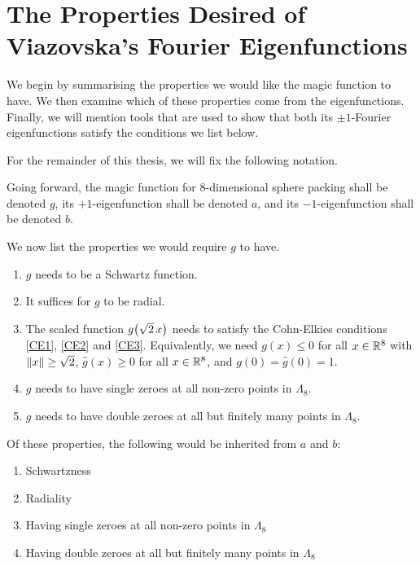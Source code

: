 \section{The Properties Desired of Viazovska's Fourier Eigenfunctions}
\label{Ch3:Sec:Properties}

We begin by summarising the properties we would like the magic function to have. We then examine which of these properties come from the eigenfunctions. Finally, we will mention tools that are used to show that both its $\pm 1$-Fourier eigenfunctions satisfy the conditions we list below.

For the remainder of this thesis, we will fix the following notation.

\begin{boxnotation}
    Going forward, the magic function for $8$-dimensional sphere packing shall be denoted $g$, its $+1$-eigenfunction shall be denoted $a$, and its $-1$-eigenfunction shall be denoted $b$.
\end{boxnotation}

We now list the properties we would require $g$ to have.

\begin{enumerate}
    \item $g$ needs to be a Schwartz function.
    \item It suffices for $g$ to be radial.
    \item The scaled function $g\!\left( \sqrt{2} \, x \right)$ needs to satisfy the Cohn-Elkies conditions \ref{CE1}, \ref{CE2} and \ref{CE3}. Equivalently, we need $g(x) \leq 0$ for all $x \in \mathbb{R}^8$ with $\left\lVert x \right\rVert \geq \sqrt{2}$, $\hat{g}(x) \geq 0$ for all $x \in \mathbb{R}^8$, and $g(0) = \hat{g}(0) = 1$.
    \item $g$ needs to have single zeroes at all non-zero points in $\Lambda_8$.
    \item $g$ needs to have double zeroes at all but finitely many points in $\Lambda_8$.
\end{enumerate}

Of these properties, the following would be inherited from $a$ and $b$:

\begin{enumerate}
    \item Schwartzness
    \item Radiality
    \item Having single zeroes at all non-zero points in $\Lambda_8$
    \item Having double zeroes at all but finitely many points in $\Lambda_8$
\end{enumerate}

